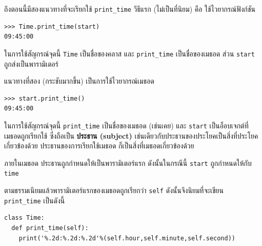 ถึงตอนนี้มีสองแนวทางที่จะเรียกใช้ \verb|print_time| วีธีแรก (ไม่เป็นที่นิยม) คือ ใช้ไวยากรณ์ฟังก์ชัน

\begin{verbatim}
>>> Time.print_time(start)
09:45:00
\end{verbatim}
%

ในการใช้สัญกรณ์จุดนี้ {\tt Time} เป็นชื่อของคลาส และ \verb|print_time| เป็นชื่อของเมธอด  ส่วน {\tt start} ถูกส่งเป็นพารามิเตอร์


แนวทางที่สอง (กระชับมากขึ้น)  เป็นการใช้ไวยากรณ์เมธอด

\begin{verbatim}
>>> start.print_time()
09:45:00
\end{verbatim}
%

ในการใช้สัญกรณ์จุดนี้ \verb|print_time| เป็นชื่อของเมธอด (เช่นเคย) และ {\tt start} 
เป็นอ็อบเจกต์ที่เมธอดถูกเรียกใช้
ซึ่งถือเป็น {\bf ประธาน (subject)} เช่นเดียวกับประธานของประโยคเป็นสิ่งที่ประโยคเกี่ยวข้องด้วย 
ประธานของการเรียกใช้เมธอด
ก็เป็นสิ่งที่เมธอดเกี่ยวข้องด้วย


ภายในเมธอด ประธานถูกกำหนดให้เป็นพารามิเตอร์แรก ดังนั้นในกรณีนี้ {\tt start} ถูกกำหนดให้กับ {\tt time}


ตามธรรมเนียมแล้วพารามิเตอร์แรกของเมธอดถูกเรียกว่า {\tt self} ดังนั้นจึงนิยมที่จะเขียน \verb|print_time| เป็นดังนี้

\begin{Verbatim}
class Time:
  def print_time(self):
    print('%.2d:%.2d:%.2d'%(self.hour,self.minute,self.second))
\end{Verbatim}
%

